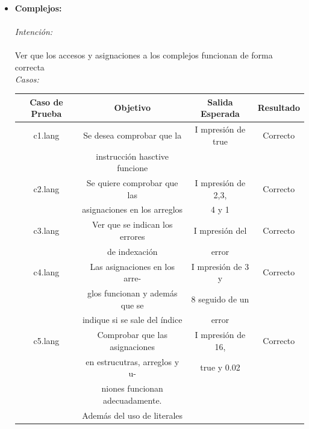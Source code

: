 \documentclass[11pt, spanish]{report}
\begin{document}
\begin{itemize}
\item \textbf{Complejos:}\\ \\
  \emph{Intenci\'on:}\\ \\
  Ver que los accesos y asignaciones a los complejos funcionan de forma correcta\\

  \emph{Casos:}\\ 
  \begin{table}[!hbp]
    \begin{tabular}{c c c c}
      \hline            
      \hline            
      Caso de Prueba & Objetivo                        & Salida Esperada      & Resultado \\ [0.5ex]
      \hline                          
      c1.lang        & Se desea comprobar que la       & I mpresi\'on de true & Correcto  \\ [1ex] 
                     & instrucci\'on hasctive funcione &                      &           \\ [1ex] 
      c2.lang        & Se quiere comprobar que las     & I mpresi\'on de 2,3, & Correcto  \\ [1ex] 
                     & asignaciones en los arreglos    & 4 y 1                &           \\ [1ex] 
      c3.lang        & Ver que se indican los errores  & I mpresi\'on del     & Correcto  \\ [1ex] 
                     & de indexaci\'on                 & error                &           \\ [1ex] 
      c4.lang        & Las asignaciones en los arre-   & I mpresi\'on de 3 y  & Correcto  \\ [1ex] 
                     & glos funcionan y además que se  & 8 seguido de un      &           \\ [1ex] 
                     & indique si se sale del \'indice & error                &           \\ [1ex] 
      c5.lang        & Comprobar que las asignaciones  & I mpresi\'on de 16,  & Correcto  \\ [1ex] 
                     & en estrucutras, arreglos y u-   & true y 0.02          &           \\ [1ex] 
                     & niones funcionan adecuadamente. &                      &           \\ [1ex] 
                     & Además del uso de literales     &                      &           \\ [1ex] 

\end{tabular}
\end{table}
\end{itemize}
\end{document}
